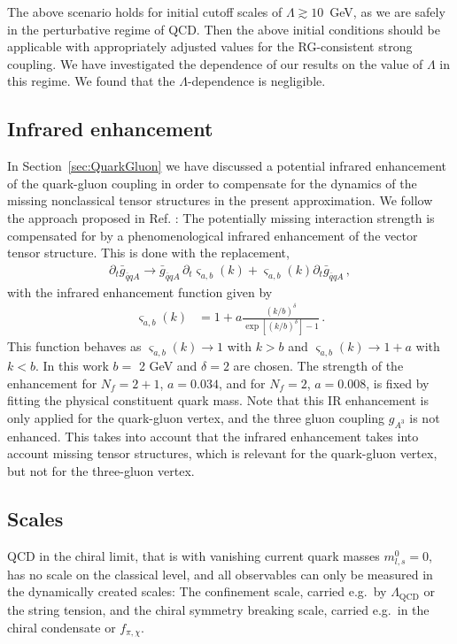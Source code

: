 \documentclass[%
reprint,
superscriptaddress,
showpacs,preprintnumbers,
 amsmath,amssymb,
 aps,
prd,
]{revtex4-1}
\def\sec#1{Section~\ref{#1}}
\begin{document}
The above scenario holds for initial cutoff scales of
$\Lambda \gtrsim 10 $\, GeV, as we are safely in the perturbative
regime of QCD. Then the above initial conditions should be applicable
with appropriately adjusted values for the RG-consistent strong
coupling. We have investigated the dependence of our results on the
value of $\Lambda$ in this regime. We found that the
$\Lambda$-dependence is negligible.

\subsection{Infrared enhancement}\label{app:IR-enhancement}

In \sec{sec:QuarkGluon} we have discussed a potential infrared
enhancement of the quark-gluon coupling in order to compensate for the
dynamics of the missing nonclassical tensor structures in the present
approximation. We follow the approach proposed in
Ref. \cite{Braun:2014ata}: The potentially missing interaction
strength is compensated for by a phenomenological infrared enhancement
of the vector tensor structure. This is done with the replacement,
%
\begin{align}\label{eq:IR-fct}
  \partial_{t} \bar{g}_{\bar q q A} \rightarrow
  \bar{g}_{\bar q q A}\, \partial_{t} \varsigma_{a,b}(k)
  +\varsigma_{a,b}(k)  \partial_{t} \bar{g}_{\bar q q A}\,,
\end{align}
%
with the infrared enhancement function given by
%
\begin{align}\label{eq:IR-enhance}
  \varsigma_{a,b}(k)&=1+a\frac{(k/b)^\delta}{\exp[ (k/b)^\delta]-1}\,.
\end{align}
%
This function behaves as $\varsigma_{a,b}(k)\rightarrow 1$ with
$k > b$ and $\varsigma_{a,b}(k)\rightarrow 1+a$ with $k < b$. In this
work $b=$ 2 GeV and $\delta=2$ are chosen. The strength of the
enhancement for $N_f=2+1$, $a=0.034$, and for $N_f=2$, $a = 0.008$, is
fixed by fitting the physical constituent quark mass. Note that this
IR enhancement is only applied for the quark-gluon vertex, and the
three gluon coupling $g_{A^3}$ is not enhanced. This takes into
account that the infrared enhancement takes into account missing
tensor structures, which is relevant for the quark-gluon vertex, but
not for the three-gluon vertex.


\subsection{Scales}\label{app:Scales}
QCD in the chiral limit, that is with vanishing current quark masses
$m_{l,s}^0=0$, has no scale on the classical level, and all observables
can only be measured in the dynamically created scales: The
confinement scale, carried e.g.\ by $\Lambda_\textrm{QCD}$ or the
string tension, and the chiral symmetry breaking scale, carried e.g.\
in the chiral condensate or $f_{\pi,\chi}$.
\end{document}
